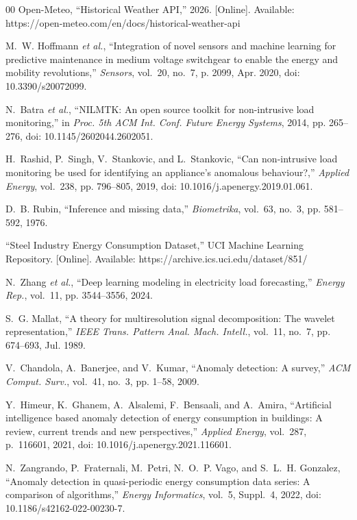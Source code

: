 \documentclass[conference]{IEEEtran}
\begin{document}
\begin{thebibliography}{00}
Open-Meteo, ``Historical Weather API,'' 2026. [Online].
Available: https://open-meteo.com/en/docs/historical-weather-api

M.~W. Hoffmann \emph{et al.}, ``Integration of novel sensors and
machine learning for predictive maintenance in medium voltage switchgear
to enable the energy and mobility revolutions,''
\emph{Sensors}, vol.~20, no.~7, p. 2099, Apr. 2020,
doi: 10.3390/s20072099.

N.~Batra \emph{et al.}, ``NILMTK: An open source toolkit for
non-intrusive load monitoring,'' in \emph{Proc. 5th ACM Int. Conf.
Future Energy Systems}, 2014, pp. 265--276,
doi: 10.1145/2602044.2602051.

H.~Rashid, P.~Singh, V.~Stankovic, and L.~Stankovic, ``Can
non-intrusive load monitoring be used for identifying an appliance's
anomalous behaviour?,'' \emph{Applied Energy}, vol.~238, pp. 796--805,
2019, doi: 10.1016/j.apenergy.2019.01.061.

D.~B. Rubin, ``Inference and missing data,''
\emph{Biometrika}, vol.~63, no.~3, pp. 581--592, 1976.

``Steel Industry Energy Consumption Dataset,'' UCI Machine
Learning Repository. [Online]. Available:
https://archive.ics.uci.edu/dataset/851/

N.~Zhang \emph{et al.}, ``Deep learning modeling in electricity
load forecasting,''
\emph{Energy Rep.}, vol.~11, pp. 3544--3556,
2024.

S.~G. Mallat, ``A theory for multiresolution signal decomposition:
The wavelet representation,''
\emph{IEEE Trans. Pattern Anal.
Mach. Intell.}, vol.~11, no.~7, pp. 674--693, Jul. 1989.

V.~Chandola, A.~Banerjee, and V.~Kumar, ``Anomaly detection:
A survey,''
\emph{ACM Comput. Surv.}, vol.~41, no.~3, pp. 1--58,
2009.

Y.~Himeur, K.~Ghanem, A.~Alsalemi, F.~Bensaali, and A.~Amira,
``Artificial intelligence based anomaly detection of energy consumption
in buildings: A review, current trends and new perspectives,''
\emph{Applied Energy}, vol.~287, p.~116601, 2021,
doi: 10.1016/j.apenergy.2021.116601.

N.~Zangrando, P.~Fraternali, M.~Petri, N.~O.~P. Vago, and
S.~L.~H. Gonzalez, ``Anomaly detection in quasi-periodic energy
consumption data series: A comparison of algorithms,''
\emph{Energy Informatics}, vol.~5, Suppl.~4, 2022,
doi: 10.1186/s42162-022-00230-7.


\end{thebibliography}
\end{document}
